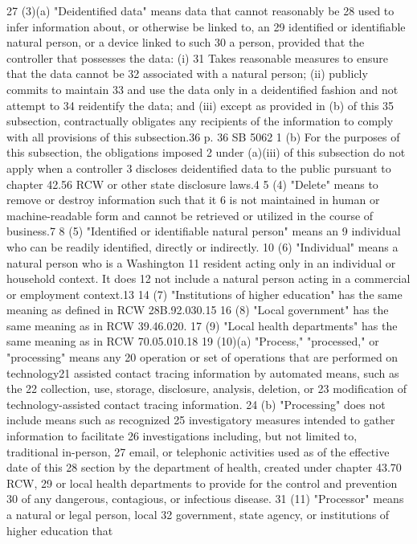 27 (3)(a) "Deidentified data" means data that cannot reasonably be
28 used to infer information about, or otherwise be linked to, an
29 identified or identifiable natural person, or a device linked to such
30 a person, provided that the controller that possesses the data: (i)
31 Takes reasonable measures to ensure that the data cannot be
32 associated with a natural person; (ii) publicly commits to maintain
33 and use the data only in a deidentified fashion and not attempt to
34 reidentify the data; and (iii) except as provided in (b) of this
35 subsection, contractually obligates any recipients of the information
to comply with all provisions of this subsection.36
p. 36 SB 5062
1 (b) For the purposes of this subsection, the obligations imposed
2 under (a)(iii) of this subsection do not apply when a controller
3 discloses deidentified data to the public pursuant to chapter 42.56
RCW or other state disclosure laws.4
5 (4) "Delete" means to remove or destroy information such that it
6 is not maintained in human or machine-readable form and cannot be
retrieved or utilized in the course of business.7
8 (5) "Identified or identifiable natural person" means an
9 individual who can be readily identified, directly or indirectly.
10 (6) "Individual" means a natural person who is a Washington
11 resident acting only in an individual or household context. It does
12 not include a natural person acting in a commercial or employment
context.13
14 (7) "Institutions of higher education" has the same meaning as
defined in RCW 28B.92.030.15
16 (8) "Local government" has the same meaning as in RCW 39.46.020.
17 (9) "Local health departments" has the same meaning as in RCW
70.05.010.18
19 (10)(a) "Process," "processed," or "processing" means any
20 operation or set of operations that are performed on technology21 assisted contact tracing information by automated means, such as the
22 collection, use, storage, disclosure, analysis, deletion, or
23 modification of technology-assisted contact tracing information.
24 (b) "Processing" does not include means such as recognized
25 investigatory measures intended to gather information to facilitate
26 investigations including, but not limited to, traditional in-person,
27 email, or telephonic activities used as of the effective date of this
28 section by the department of health, created under chapter 43.70 RCW,
29 or local health departments to provide for the control and prevention
30 of any dangerous, contagious, or infectious disease.
31 (11) "Processor" means a natural or legal person, local
32 government, state agency, or institutions of higher education that
